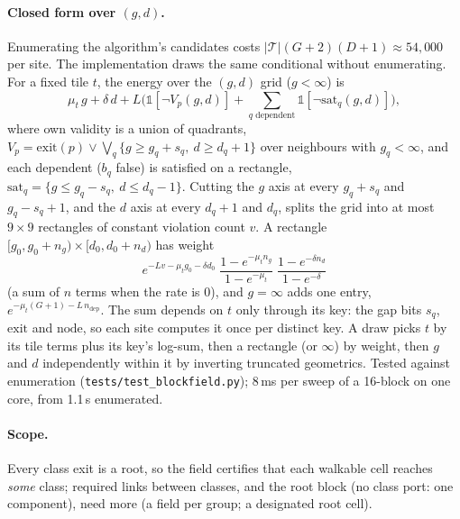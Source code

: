 \documentclass[11pt]{article}
\newcommand{\1}{\mathds{1}}
\begin{document}
\paragraph{Closed form over $(g, d)$.} Enumerating the algorithm's candidates costs
$|\mathcal T| (G+2) (D+1) \approx 54{,}000$ per site. The implementation draws the same
conditional without enumerating. For a fixed tile $t$, the energy over the $(g,d)$ grid
($g < \infty$) is
\[
  \mu_t\, g + \delta\, d + L\Big(\1[\lnot V_p(g,d)] + \sum_{q \text{ dependent}} \1[\lnot \mathrm{sat}_q(g,d)]\Big),
\]
where own validity is a union of quadrants, $V_p = \mathrm{exit}(p) \lor \bigvee_q
\{g \ge g_q + s_q,\ d \ge d_q + 1\}$ over neighbours with $g_q < \infty$, and each dependent
($b_q$ false) is satisfied on a rectangle, $\mathrm{sat}_q = \{g \le g_q - s_q,\ d \le d_q - 1\}$.
Cutting the $g$ axis at every $g_q + s_q$ and $g_q - s_q + 1$, and the $d$ axis at every
$d_q + 1$ and $d_q$, splits the grid into at most $9 \times 9$ rectangles of constant
violation count $v$. A rectangle $[g_0, g_0 + n_g) \times [d_0, d_0 + n_d)$ has weight
\[
  e^{-Lv - \mu_t g_0 - \delta d_0}\;
  \frac{1 - e^{-\mu_t n_g}}{1 - e^{-\mu_t}}\;
  \frac{1 - e^{-\delta n_d}}{1 - e^{-\delta}}
\]
(a sum of $n$ terms when the rate is 0), and $g = \infty$ adds one entry,
$e^{-\mu_t (G+1) - L\,n_{\text{dep}}}$. The sum depends on $t$ only through its key: the gap
bits $s_q$, $\mathrm{exit}$ and $\mathrm{node}$, so each site computes it once per distinct
key. A draw picks $t$ by its tile terms plus its key's log-sum, then a rectangle (or
$\infty$) by weight, then $g$ and $d$ independently within it by inverting truncated
geometrics. Tested against enumeration (\texttt{tests/test\_blockfield.py}); 8\,ms per
sweep of a 16-block on one core, from 1.1\,s enumerated.

\paragraph{Scope.} Every class exit is a root, so the field certifies that
each walkable cell reaches \emph{some} class; required links between classes, and the root
block (no class port: one component), need more (a field per group; a designated root cell).
\end{document}
